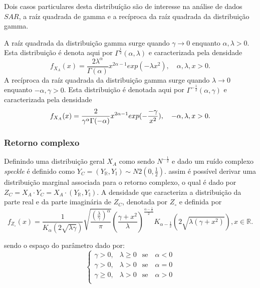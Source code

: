 Dois casos particulares desta distribuíção são de interesse na análise de dados $SAR$, a raíz quadrada de gamma e a recíproca da raíz quadrada da distribuição gamma. 

A raíz quadrada da distribuição gamma surge quando $\gamma \rightarrow 0$ enquanto $\alpha,\lambda>0$. Esta distribuição é denota aqui por $\Gamma^{\frac{1}{2}}(\alpha,\lambda)$ e caracterizada pela densidade 
\begin{equation}\label{eqn105}
	f_{X_{A}}(x)=\frac{2\lambda^{\alpha}}{\Gamma(\alpha)}x^{2\alpha-1}exp(-\lambda x^2), \quad \alpha,\lambda, x>0. 
\end{equation}
A recíproca da raíz quadrada da distribuição gamma surge quando $\lambda\rightarrow 0$ enquanto $-\alpha,\gamma>0$. Esta distribuição é denotada aqui por $\Gamma^{-\frac{1}{2}}(\alpha,\gamma) $ e caracterizada pela densidade
\begin{equation}\label{eqn106}
	f_{X_{A}}(x)=\frac{2}{\gamma^{\alpha}\Gamma(-\alpha)}x^{2\alpha-1}exp(-\frac{-\gamma}{x^2}), \quad -\alpha,\lambda, x>0. \\
\end{equation}

\subsubsection{Retorno complexo}

Definindo uma distribuição geral $X_{A}$ como sendo $N^{-\frac{1}{2}}$ e dado um ruído complexo {\it speckle} é definido como $Y_{C}=(Y_{\mathbb{R}},Y_{\mathbb{I}})\sim N2(0,\frac{1}{2})$. assim é possível derivar uma distribuição marginal associada para o retorno complexo, o qual é dado por $Z_{C}=X_{A}\cdot Y_{C}=X_{
A}\cdot(Y_{\mathbb{R}},Y_{\mathbb{I}})$. A densidade que caracteriza a distribuição da parte real e da parte imaginária de $Z_{C}$, denotada por $Z_{\circ}$ e definida por
\begin{equation}\label{eqn107}
	f_{Z_{\circ}}(x)=\frac{1}{K_{\alpha}(2\sqrt{\lambda\gamma})}\sqrt{\frac{\left(\frac{\lambda}{\gamma} \right)^{\alpha}}{\pi}}\left(\frac{\gamma+x^2}{\lambda} \right)^{\frac{\alpha-\frac{1}{2}}{2}}K_{\alpha-\frac{1}{2}}\left(2\sqrt{\lambda(\gamma+x^2)}\right), x\in\mathbb{R}. 
\end{equation}

sendo o espaço do parâmetro dado por:
\begin{equation}\label{eqn108}
	\left\{
\begin{array}{ccr}
	\gamma>0,&\lambda\geq 0&\mbox{se}\quad\alpha<0 \\
	\gamma>0,&\lambda > 0&\mbox{se}\quad\alpha=0 \\
	\gamma\geq0,&\lambda> 0&\mbox{se}\quad\alpha>0 \\
\end{array}
\right.
\end{equation}

